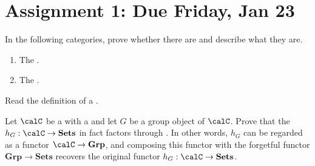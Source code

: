 \section{Assignment 1: Due Friday, Jan 23}

\begin{problem}
    In the following categories, prove whether there are  and describe what they are.
    \begin{enumerate}
        \item The .
        \item The .
    \end{enumerate}
\end{problem}



Read the definition of a .

\begin{problem}
    Let $\calC$ be a  with a  and let $G$ be a group object of $\calC$. Prove that the  $h_G: \calC \to \mathbf{Sets}$ in fact factors through . In other words, $h_G$ can be regarded as a functor $\calC \to \mathbf{Grp}$, and composing this functor with the forgetful functor $\mathbf{Grp} \to \mathbf{Sets}$ recovers the original functor $h_G: \calC \to \mathbf{Sets}$.
\end{problem}

